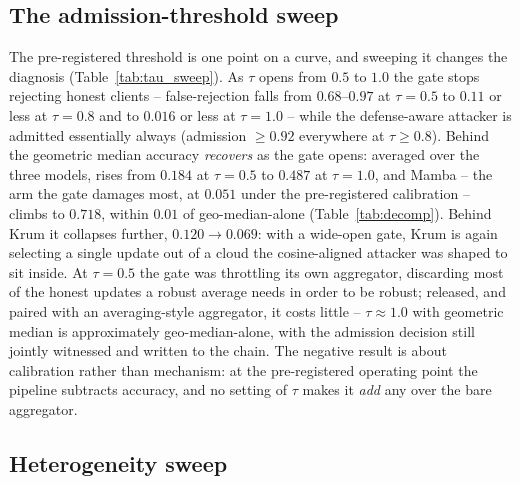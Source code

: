 \documentclass[review,12pt]{elsarticle}
\begin{document}
\subsection{The admission-threshold sweep}
\label{sec:sup-res-tau}

The pre-registered threshold is one point on a curve, and sweeping it
changes the diagnosis (Table~\ref{tab:tau_sweep}). As $\tau$ opens from
$0.5$ to $1.0$ the gate stops rejecting honest clients -- false-rejection
falls from $0.68$--$0.97$ at $\tau=0.5$ to $0.11$ or less at $\tau=0.8$
and to $0.016$ or less at $\tau=1.0$ -- while the defense-aware attacker
is admitted essentially always (admission $\ge 0.92$ everywhere at
$\tau \ge 0.8$). Behind the geometric median accuracy \emph{recovers} as
the gate opens: averaged over the three models, \macroF{} rises from
$0.184$ at $\tau=0.5$ to $0.487$ at $\tau=1.0$, and Mamba -- the arm the
gate damages most, at $0.051$ under the pre-registered calibration --
climbs to $0.718$, within $0.01$ of geo-median-alone
(Table~\ref{tab:decomp}). Behind Krum it collapses further, $0.120
\rightarrow 0.069$: with a wide-open gate, Krum is again selecting a
single update out of a cloud the cosine-aligned attacker was shaped to
sit inside. At $\tau=0.5$ the gate was throttling its own aggregator,
discarding most of the honest updates a robust average needs in order to
be robust; released, and paired with an averaging-style aggregator, it
costs little -- $\tau \approx 1.0$ with geometric median is
approximately geo-median-alone, with the admission decision still
jointly witnessed and written to the chain. The negative result is about
calibration rather than mechanism: at the pre-registered operating point
the pipeline subtracts accuracy, and no setting of $\tau$ makes it
\emph{add} any over the bare aggregator.

\begin{table}[tbp]
\centering
\caption{Admission-threshold sweep under the defense-aware attacker (random split)}
\label{tab:tau_sweep}

\end{table}

\subsection{Heterogeneity sweep}
\label{sec:sup-res-alpha}

\begin{table}[tbp]
\centering
\caption{Non-IID severity sweep (T2a, random split, 9 seeds)}
\label{tab:alpha}

\end{table}
\end{document}

